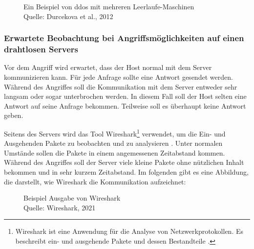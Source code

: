 \begin{figure}[H]
  \caption{Ein Beispiel von \acrfull{ddos} mit mehreren Leerlaufe-Maschinen
  \\ Quelle: Durcekova et al., 2012}
  \label{fig:VDSD}
\end{figure}

\subsubsection{Erwartete Beobachtung bei Angriffsmöglichkeiten auf einen drahtlosen Servers}
Vor dem Angriff wird erwartet, dass der Host normal mit dem Server kommunizieren kann. Für jede Anfrage sollte eine
Antwort gesendet werden. Während des Angriffes soll die Kommunikation mit dem Server entweder sehr langsam oder sogar unterbrochen 
werden. In diesem Fall soll der Host selten eine Antwort auf seine Anfrage bekommen. Teilweise soll es überhaupt 
keine Antwort geben. 

Seitens des Servers wird das Tool Wireshark\footnote{Wireshark ist eine Anwendung für die Analyse von Netzwerkprotokollen.
Es beschreibt ein- und ausgehende Pakete und dessen Bestandteile \cite{refst:wisa}.} verwendet, um die Ein- und Ausgehenden
Pakete zu beobachten und zu analysieren \cite{refart:UBEC}. Unter normalen Umstände sollen die Pakete in einem angemessenen
Zeitabstand kommen. Während des Angriffes soll der Server viele kleine Pakete ohne nützlichen Inhalt bekommen und in sehr 
kurzem Zeitabstand. Im folgenden gibt es eine Abbildung, die darstellt, wie Wireshark die Kommunikation aufzeichnet:

\begin{figure}[H]
  \caption{Beispiel Ausgabe von Wireshark \\Quelle: Wireshark, 2021}
  \label{fig:refst_wisa}
\end{figure}

